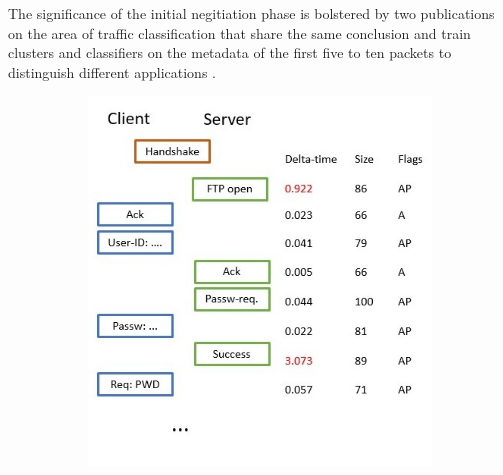 \documentclass[a4paper,12pt,twoside]{report}
\begin{document}
The significance of the initial negitiation phase is bolstered by two publications on the area of traffic classification that share the same conclusion and train clusters and classifiers on the metadata of the first five to ten packets to distinguish different applications \cite{bernaille2006traffic,crotti2007traffic}.


\begin{figure}\label{negot}
\centering
\begin{subfigure}[b]{0.49\textwidth}\label{FTP}
\includegraphics[width=\textwidth]{images/FTP.jpg}
\caption{}
\end{subfigure}
\begin{subfigure}[b]{0.49\textwidth}\label{SSH}

\end{subfigure}
\end{figure}
\end{document}
